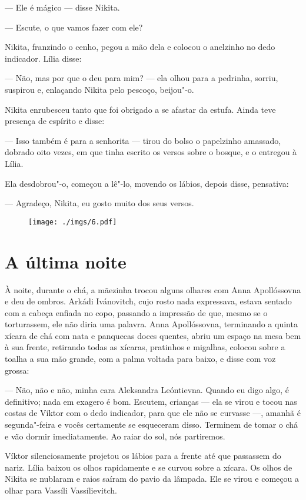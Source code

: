 --- Ele é mágico --- disse Nikita.

--- Escute, o que vamos fazer com ele?

Nikita, franzindo o cenho, pegou a mão dela e colocou o anelzinho no
dedo indicador. Lília disse:

--- Não, mas por que o deu para mim? --- ela olhou para a pedrinha,
sorriu, suspirou e, enlaçando Nikita pelo pescoço, beijou"-o.

Nikita enrubesceu tanto que foi obrigado a se afastar da estufa. Ainda
teve presença de espírito e disse:

--- Isso também é para a senhorita --- tirou do bolso o papelzinho
amassado, dobrado oito vezes, em que tinha escrito os versos sobre o
bosque, e o entregou à Lília.

Ela desdobrou"-o, começou a lê"-lo, movendo os lábios, depois disse,
pensativa:

--- Agradeço, Nikita, eu gosto muito dos seus versos.

\begin{figure}
\vspace*{-2.1cm}
\hspace*{-2.5cm}\texttt{[image: ./imgs/6.pdf]}
\end{figure}

\chapter{A última noite}

À noite, durante o chá, a mãezinha trocou alguns olhares com Anna
Apollóssovna e deu de ombros. Arkádi Ivánovitch, cujo rosto nada
expressava, estava sentado com a cabeça enfiada no copo, passando a
impressão de que, mesmo se o torturassem, ele não diria uma palavra.
Anna Apollóssovna, terminando a quinta xícara de chá com nata e
panquecas doces quentes, abriu um espaço na mesa bem à sua frente,
retirando todas as xícaras, pratinhos e migalhas, colocou sobre a toalha
a sua mão grande, com a palma voltada para baixo, e disse com voz
grossa:

--- Não, não e não, minha cara Aleksandra Leóntievna. Quando eu digo
algo, é definitivo; nada em exagero é bom. Escutem, crianças --- ela se
virou e tocou nas costas de Víktor com o dedo indicador, para que ele
não se curvasse ---, amanhã é segunda"-feira e vocês certamente se
esqueceram disso. Terminem de tomar o chá e vão dormir imediatamente. Ao
raiar do sol, nós partiremos.

Víktor silenciosamente projetou os lábios para a frente até que
passassem do nariz. Lília baixou os olhos rapidamente e se curvou sobre
a xícara. Os olhos de Nikita se nublaram e raios saíram do pavio da
lâmpada. Ele se virou e começou a olhar para Vassíli Vassílievitch.

